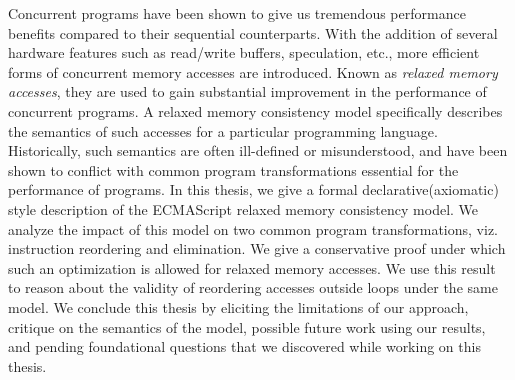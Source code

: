 Concurrent programs have been shown to give us tremendous performance benefits compared to their sequential counterparts.
With the addition of several hardware features such as read/write buffers, speculation, etc., more efficient forms of concurrent memory accesses are introduced.
Known as \textit{relaxed memory accesses}, they are used to gain substantial improvement in the performance of concurrent programs. 
A relaxed memory consistency model specifically describes the semantics of such accesses for a particular programming language. 
Historically, such semantics are often ill-defined or misunderstood, and have been shown to conflict with common program transformations essential for the performance of programs. 
In this thesis, we give a formal declarative(axiomatic) style description of the ECMAScript relaxed memory consistency model. 
We analyze the impact of this model on two common program transformations, viz. instruction reordering and elimination. 
We give a conservative proof under which such an optimization is allowed for relaxed memory accesses. 
We use this result to reason about the validity of reordering accesses outside loops under the same model. 
We conclude this thesis by eliciting the limitations of our approach, critique on the semantics of the model, possible future work using our results, and pending foundational questions that we discovered while working on this thesis.